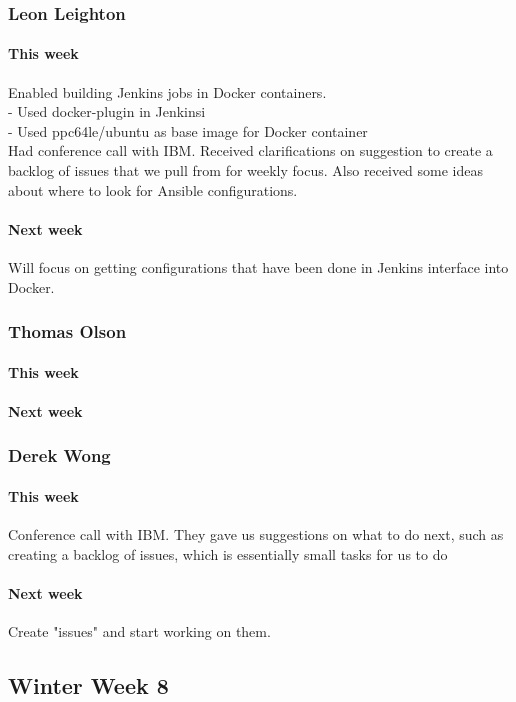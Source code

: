 \documentclass[10pt,letterpaper,onecolumn,draftclsnofoot]{IEEEtran}
\begin{document}
\subsubsection{Leon Leighton}
\paragraph{This week}Enabled building Jenkins jobs in Docker containers.\\
- Used docker-plugin in Jenkinsi\\
- Used ppc64le/ubuntu as base image for Docker container \\ 
Had conference call with IBM. Received clarifications on suggestion to create a backlog of issues that we pull from for weekly focus. Also received some ideas about where to look for Ansible configurations.  
\paragraph{Next week}Will focus on getting configurations that have been done in Jenkins interface into Docker.


\subsubsection{Thomas Olson}
\paragraph{This week}
\paragraph{Next week}


\subsubsection{Derek Wong}
\paragraph{This week}Conference call with IBM. They gave us suggestions on what to do next, such as creating a backlog of issues, which is essentially small tasks for us to do
\paragraph{Next week}Create "issues" and start working on them.


\subsection{Winter Week 8}
\end{document}
